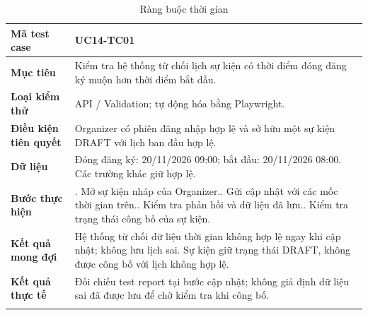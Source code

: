 \begin{table}[H]
\centering
\begingroup\small
\renewcommand{\arraystretch}{1.18}
\caption{Ràng buộc thời gian}\label{tab:i1-detail-4}
\begin{tabularx}{\linewidth}{@{}p{.23\linewidth}>{\raggedright\arraybackslash}X@{}}
\toprule
\textbf{Mã test case} & \textbf{UC14-TC01} \\\midrule
\textbf{Mục tiêu} & Kiểm tra hệ thống từ chối lịch sự kiện có thời điểm đóng đăng ký muộn hơn thời điểm bắt đầu. \\ \addlinespace[3pt]
\textbf{Loại kiểm thử} & API / Validation; tự động hóa bằng Playwright. \\ \addlinespace[3pt]
\textbf{Điều kiện tiên quyết} & Organizer có phiên đăng nhập hợp lệ và sở hữu một sự kiện DRAFT với lịch ban đầu hợp lệ. \\ \addlinespace[3pt]
\textbf{Dữ liệu} & Đóng đăng ký: 20/11/2026 09:00; bắt đầu: 20/11/2026 08:00. Các trường khác giữ hợp lệ. \\ \addlinespace[3pt]
\textbf{Bước thực hiện} & 1. Mở sự kiện nháp của Organizer.\newline 2. Gửi cập nhật với các mốc thời gian trên.\newline 3. Kiểm tra phản hồi và dữ liệu đã lưu.\newline 4. Kiểm tra trạng thái công bố của sự kiện. \\ \addlinespace[3pt]
\textbf{Kết quả mong đợi} & Hệ thống từ chối dữ liệu thời gian không hợp lệ ngay khi cập nhật; không lưu lịch sai. Sự kiện giữ trạng thái DRAFT, không được công bố với lịch không hợp lệ. \\ \addlinespace[3pt]
\textbf{Kết quả thực tế} & Đối chiếu test report tại bước cập nhật; không giả định dữ liệu sai đã được lưu để chờ kiểm tra khi công bố. \\ \addlinespace[3pt]
\bottomrule
\end{tabularx}
\endgroup
\end{table}

